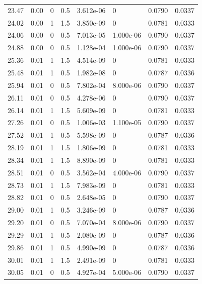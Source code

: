 \documentclass[preview]{standalone}
\begin{document}
{{{\begin{tabular}{L{1.2cm}C{1.2cm} C{0.3cm}C{0.5cm} C{1.4cm}C{1.4cm} C{1.4cm}C{1.4cm}}
  23.47  &  0.00  & 0     & 0.5 &  3.612e-06  & 0  & 0.0790 &  0.0337   \\ 
  24.02  &  0.00  & 1     & 1.5 &  3.850e-09  & 0  & 0.0781 &  0.0333   \\ 
  24.06  &  0.00  & 0     & 0.5 &  7.013e-05  & 1.000e-06  & 0.0790 &  0.0337   \\ 
  24.88  &  0.00  & 0     & 0.5 &  1.128e-04  & 1.000e-06  & 0.0790 &  0.0337   \\ 
  25.36  &  0.01  & 1     & 1.5 &  4.514e-09  & 0  & 0.0781 &  0.0333   \\ 
  25.48  &  0.01  & 1     & 0.5 &  1.982e-08  & 0  & 0.0787 &  0.0336   \\ 
  25.94  &  0.01  & 0     & 0.5 &  7.802e-04  & 8.000e-06  & 0.0790 &  0.0337   \\ 
  26.11  &  0.01  & 0     & 0.5 &  4.278e-06  & 0  & 0.0790 &  0.0337   \\ 
  26.14  &  0.01  & 1     & 1.5 &  5.609e-09  & 0  & 0.0781 &  0.0333   \\ 
  27.26  &  0.01  & 0     & 0.5 &  1.006e-03  & 1.100e-05  & 0.0790 &  0.0337   \\ 
  27.52  &  0.01  & 1     & 0.5 &  5.598e-09  & 0  & 0.0787 &  0.0336   \\ 
  28.19  &  0.01  & 1     & 1.5 &  1.806e-09  & 0  & 0.0781 &  0.0333   \\ 
  28.34  &  0.01  & 1     & 1.5 &  8.890e-09  & 0  & 0.0781 &  0.0333   \\ 
  28.51  &  0.01  & 0     & 0.5 &  3.562e-04  & 4.000e-06  & 0.0790 &  0.0337   \\ 
  28.73  &  0.01  & 1     & 1.5 &  7.983e-09  & 0  & 0.0781 &  0.0333   \\ 
  28.82  &  0.01  & 0     & 0.5 &  2.648e-05  & 0  & 0.0790 &  0.0337   \\ 
  29.00  &  0.01  & 1     & 0.5 &  3.246e-09  & 0  & 0.0787 &  0.0336   \\ 
  29.20  &  0.01  & 0     & 0.5 &  7.070e-04  & 8.000e-06  & 0.0790 &  0.0337   \\ 
  29.29  &  0.01  & 1     & 0.5 &  2.080e-09  & 0  & 0.0787 &  0.0336   \\ 
  29.86  &  0.01  & 1     & 0.5 &  4.990e-09  & 0  & 0.0787 &  0.0336   \\ 
  30.01  &  0.01  & 1     & 1.5 &  2.491e-09  & 0  & 0.0781 &  0.0333   \\ 
  30.05  &  0.01  & 0     & 0.5 &  4.927e-04  & 5.000e-06  & 0.0790 &  0.0337   \\ 

\end{tabular}}}}
\end{document}
